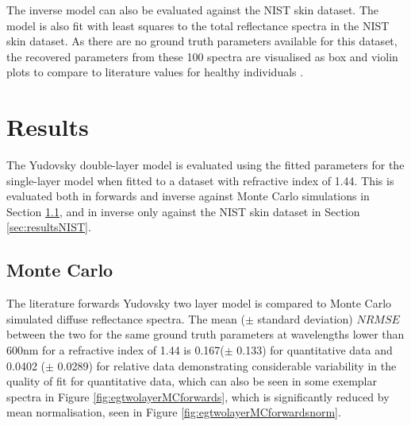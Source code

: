 The inverse model can also be evaluated against the NIST skin dataset\cite{Cooksey2017}. The model is also fit with least squares to the total reflectance spectra in the NIST skin dataset. As there are no ground truth parameters available for this dataset, the recovered parameters from these 100 spectra are visualised as box and violin plots to compare to literature values for healthy individuals  \cite{Jacques2013, VanManen2021, Nishidate2011, Lintzeri2022}. 
\FloatBarrier

\section{Results}\label{sec:results2}
The Yudovsky double-layer model is evaluated using the fitted parameters for the single-layer model when fitted to a dataset with refractive index of 1.44. This is evaluated both in forwards and inverse against Monte Carlo simulations in Section \ref{sec:resultsMC2}, and in inverse only against the NIST skin dataset in Section \ref{sec:resultsNIST}.

\subsection{Monte Carlo}\label{sec:resultsMC2}
The literature forwards Yudovsky two layer model is compared to Monte Carlo simulated diffuse reflectance spectra. The mean ($\pm$ standard deviation) $NRMSE$ between the two for the same ground truth parameters at wavelengths lower than 600nm for a refractive index of 1.44 is 0.167($\pm$ 0.133) for quantitative data and 0.0402 ($\pm$ 0.0289) for relative data demonstrating considerable variability in the quality of fit for quantitative data, which can also be seen in some exemplar spectra in Figure \ref{fig:egtwolayerMCforwards}, which is significantly reduced by mean normalisation, seen in Figure \ref{fig:egtwolayerMCforwardsnorm}.

